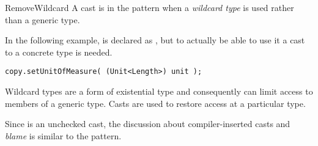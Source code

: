 \begin{pattern}{RemoveWildcard}
A cast is in the \thisp{} pattern when a \emph{wildcard type} is used rather than a generic type.


\instances{}
In the following example,%
\def\urlvar{http://bit.ly/eclipse_jetty_project_2WMI0Ld}
 is declared as ,
but to actually be able to use it a cast to a concrete type is needed.

\begin{verbatim}
copy.setUnitOfMeasure( (Unit<Length>) unit );
\end{verbatim}


\discussion{}
Wildcard types are a form of existential type and consequently can limit
access to members of a generic type.
Casts are used to restore access at a particular type.

Since \thisp{} is an unchecked cast,
the discussion about compiler-inserted casts and \emph{blame} is similar to the  pattern.

\end{pattern}
